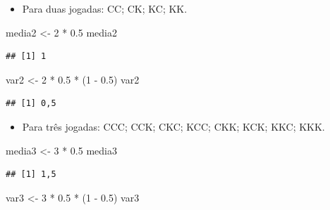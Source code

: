 \documentclass[
]{book}
\newenvironment{Shaded}{\begin{snugshade}}{\end{snugshade}}
\newcommand{\DecValTok}[1]{\textcolor[rgb]{0.00,0.00,0.81}{#1}}
\newcommand{\FloatTok}[1]{\textcolor[rgb]{0.00,0.00,0.81}{#1}}
\newcommand{\NormalTok}[1]{#1}
\newcommand{\OtherTok}[1]{\textcolor[rgb]{0.56,0.35,0.01}{#1}}
\newcommand{\SpecialCharTok}[1]{\textcolor[rgb]{0.00,0.00,0.00}{#1}}
\providecommand{\tightlist}{%
  \setlength{\itemsep}{0pt}\setlength{\parskip}{0pt}}
\begin{document}
\begin{itemize}
\tightlist
\item
  Para duas jogadas: CC; CK; KC; KK.
\end{itemize}

\begin{Shaded}
\begin{Highlighting}[]
\NormalTok{media2 }\OtherTok{\textless{}{-}} \DecValTok{2} \SpecialCharTok{*} \FloatTok{0.5}
\NormalTok{media2}
\end{Highlighting}
\end{Shaded}

\begin{verbatim}
## [1] 1
\end{verbatim}

\begin{Shaded}
\begin{Highlighting}[]
\NormalTok{var2 }\OtherTok{\textless{}{-}} \DecValTok{2} \SpecialCharTok{*} \FloatTok{0.5} \SpecialCharTok{*}\NormalTok{ (}\DecValTok{1} \SpecialCharTok{{-}} \FloatTok{0.5}\NormalTok{)}
\NormalTok{var2}
\end{Highlighting}
\end{Shaded}

\begin{verbatim}
## [1] 0,5
\end{verbatim}

\begin{itemize}
\tightlist
\item
  Para três jogadas: CCC; CCK; CKC; KCC; CKK; KCK; KKC; KKK.
\end{itemize}

\begin{Shaded}
\begin{Highlighting}[]
\NormalTok{media3 }\OtherTok{\textless{}{-}} \DecValTok{3} \SpecialCharTok{*} \FloatTok{0.5}
\NormalTok{media3}
\end{Highlighting}
\end{Shaded}

\begin{verbatim}
## [1] 1,5
\end{verbatim}

\begin{Shaded}
\begin{Highlighting}[]
\NormalTok{var3 }\OtherTok{\textless{}{-}} \DecValTok{3} \SpecialCharTok{*} \FloatTok{0.5} \SpecialCharTok{*}\NormalTok{ (}\DecValTok{1} \SpecialCharTok{{-}} \FloatTok{0.5}\NormalTok{)}
\NormalTok{var3}
\end{Highlighting}
\end{Shaded}
\end{document}
